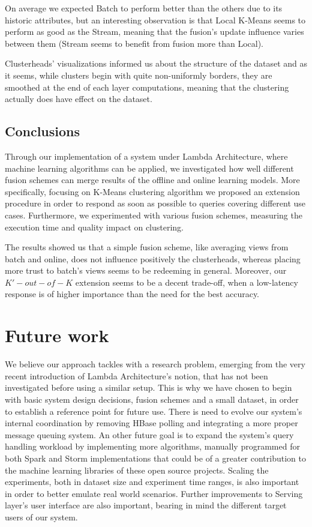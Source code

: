 \documentclass{lmproj}
\begin{document}
On average we expected Batch to perform better than the others due to its historic attributes, but an interesting observation is that Local K-Means seems to perform as good as the Stream, meaning that the fusion's update influence varies between them (Stream seems to benefit from fusion more than Local).

Clusterheads' visualizations informed us about the structure of the dataset and as it seems, while clusters begin with quite non-uniformly borders, they are smoothed at the end of each layer computations, meaning that the clustering actually does have effect on the dataset. 

\section{Conclusions}
\label{conclusions}

Through our implementation of a system under Lambda Architecture, where machine learning algorithms can be applied, we investigated how well different fusion schemes can merge results of the offline and online learning models. More specifically, focusing on K-Means clustering algorithm we proposed an extension procedure in order to respond as soon as possible to queries covering different use cases. Furthermore, we experimented with various fusion schemes, measuring the execution time and quality impact on clustering. 

The results showed us that a simple fusion scheme, like averaging views from batch and online, does not influence positively the clusterheads, whereas placing more trust to batch's views seems to be redeeming in general. Moreover, our $K'-out-of-K$ extension seems to be a decent trade-off, when a low-latency response is of higher importance than the need for the best accuracy.



\chapter{Future work}
\label{future_work}

We believe our approach tackles with a research problem, emerging from the very recent introduction of Lambda Architecture's notion, that has not been investigated before using a similar setup. This is why we have chosen to begin with basic system design decisions, fusion schemes and a small dataset, in order to establish a reference point for future use. There is need to evolve our system's internal coordination by removing HBase polling and integrating a more proper message queuing system. An other future goal is to expand the system's query handling workload by implementing more algorithms, manually programmed for both Spark and Storm implementations that could be of a greater contribution to the machine learning libraries of these open source projects. Scaling the experiments, both in dataset size and experiment time ranges, is also important in order to better emulate real world scenarios. Further improvements to Serving layer's user interface are also important, bearing in mind the different target users of our system.




\nocite{*}
\end{document}
